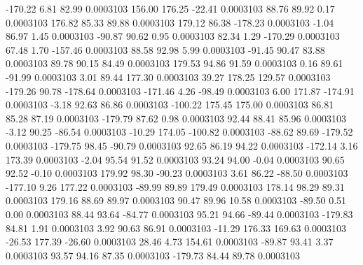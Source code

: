      -170.22        6.81       82.99     0.0003103
      156.00      176.25      -22.41     0.0003103
       88.76       89.92        0.17     0.0003103
      176.82       85.33       89.88     0.0003103
      179.12       86.38     -178.23     0.0003103
       -1.04       86.97        1.45     0.0003103
      -90.87       90.62        0.95     0.0003103
       82.34        1.29     -170.29     0.0003103
       67.48        1.70     -157.46     0.0003103
       88.58       92.98        5.99     0.0003103
      -91.45       90.47       83.88     0.0003103
       89.78       90.15       84.49     0.0003103
      179.53       94.86       91.59     0.0003103
        0.16       89.61      -91.99     0.0003103
        3.01       89.44      177.30     0.0003103
       39.27      178.25      129.57     0.0003103
     -179.26       90.78     -178.64     0.0003103
     -171.46        4.26      -98.49     0.0003103
        6.00      171.87     -174.91     0.0003103
       -3.18       92.63       86.86     0.0003103
     -100.22      175.45      175.00     0.0003103
       86.81       85.28       87.19     0.0003103
     -179.79       87.62        0.98     0.0003103
       92.44       88.41       85.96     0.0003103
       -3.12       90.25      -86.54     0.0003103
      -10.29      174.05     -100.82     0.0003103
      -88.62       89.69     -179.52     0.0003103
     -179.75       98.45      -90.79     0.0003103
       92.65       86.19       94.22     0.0003103
     -172.14        3.16      173.39     0.0003103
       -2.04       95.54       91.52     0.0003103
       93.24       94.00       -0.04     0.0003103
       90.65       92.52       -0.10     0.0003103
      179.92       98.30      -90.23     0.0003103
        3.61       86.22      -88.50     0.0003103
     -177.10        9.26      177.22     0.0003103
      -89.99       89.89      179.49     0.0003103
      178.14       98.29       89.31     0.0003103
      179.16       88.69       89.97     0.0003103
       90.47       89.96       10.58     0.0003103
      -89.50        0.51        0.00     0.0003103
       88.44       93.64      -84.77     0.0003103
       95.21       94.66      -89.44     0.0003103
     -179.83       84.81        1.91     0.0003103
        3.92       90.63       86.91     0.0003103
      -11.29      176.33      169.63     0.0003103
      -26.53      177.39      -26.60     0.0003103
       28.46        4.73      154.61     0.0003103
      -89.87       93.41        3.37     0.0003103
       93.57       94.16       87.35     0.0003103
     -179.73       84.44       89.78     0.0003103
